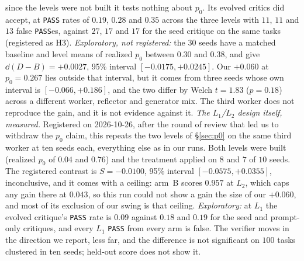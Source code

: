 \documentclass[11pt]{article}
\begin{document}
\begin{description}
    since the levels were not built it tests nothing about $p_0$. Its evolved critics did accept,
    at \texttt{PASS} rates of $0.19$, $0.28$ and $0.35$ across the three levels with $11$, $11$ and
    $13$ false \texttt{PASS}es, against $27$, $17$ and $17$ for the seed critique on the same tasks
    (registered as H3). \emph{Exploratory, not
    registered:} the $30$ seeds have a matched baseline and level means of realized $p_0$ between
    $0.30$ and $0.38$, and give $\dd(D-B) = +0.0027$, 95\% interval $[-0.0175, +0.0245]$. Our
    $+0.060$ at $p_0 = 0.267$ lies outside that interval, but it comes from three seeds whose own
    interval is $[-0.066, +0.186]$, and the two differ by Welch $t = 1.83$ ($p = 0.18$) across a
    different worker, reflector and generator mix. The third worker does not reproduce the gain,
    and it is not evidence against it.
    \emph{The $L_1$/$L_2$ design itself, measured.} Registered on 2026-10-26, after the round of
    review that led us to withdraw the $p_0$ claim, this repeats the two levels of
    \S\ref{sec:p0} on the same third worker at ten seeds each, everything else as in our runs.
    Both levels were built (realized $p_0$ of $0.04$ and $0.76$) and the treatment applied on
    $8$ and $7$ of $10$ seeds. The registered contrast is $S = -0.0100$, 95\% interval
    $[-0.0575, +0.0355]$, inconclusive, and it comes with a ceiling: arm~B scores $0.957$ at $L_2$,
    which caps any gain there at $0.043$, so this run could not show a gain the size of our
    $+0.060$, and most of its exclusion of our swing is that ceiling. \emph{Exploratory:} at $L_1$
    the evolved critique's \texttt{PASS} rate is $0.09$ against $0.18$ and $0.19$ for the seed
    and prompt-only critiques, and every $L_1$ \texttt{PASS} from every arm is false. The verifier
    moves in the direction we report, less far, and the difference is not significant on $100$
    tasks clustered in ten seeds; held-out score does not show it.
\end{description}
\end{document}

